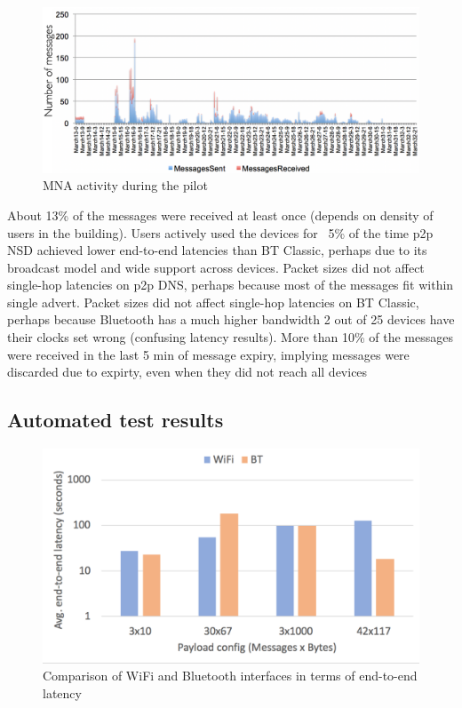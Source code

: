 \documentclass[conference]{IEEEtran}
\begin{document}
\begin{figure}[htbp]
\centerline{\includegraphics[width=\columnwidth]{figs/romania_activity}}
\caption{MNA activity during the pilot}
\label{fig:romania_act}
\end{figure}


About 13\% of the messages were received at least once (depends on
density of users in the building). Users actively used the devices for
~5\% of the time p2p NSD achieved lower end-to-end latencies than BT
Classic, perhaps due to its broadcast model and wide support across
devices. Packet sizes did not affect single-hop latencies on p2p DNS,
perhaps because most of the messages fit within single advert. Packet
sizes did not affect single-hop latencies on BT Classic, perhaps
because Bluetooth has a much higher bandwidth 2 out of 25 devices have
their clocks set wrong (confusing latency results). More than 10\% of
the messages were received in the last 5 min of message expiry,
implying messages were discarded due to expirty, even when they did
not reach all devices

%
\subsection{Automated test results}
\label{sec:automated}
%
\begin{figure}[htbp]
\centerline{\includegraphics[width=\columnwidth]{figs/variety_e2e_latency}}
\caption{Comparison of WiFi and Bluetooth interfaces in terms of
  end-to-end latency}
\label{fig:variety_e2e}
\end{figure}
\end{document}
